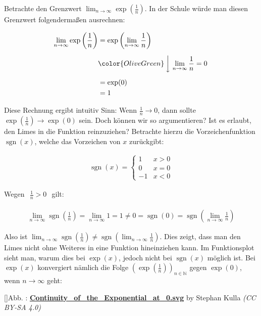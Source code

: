\documentclass[fontsize=9pt,
               parskip=half-,
               DIV=14,
               listof=chapterentry,
               tocflat]{scrbook}
\newcounter{imagelabel}
\begin{document}
Betrachte den Grenzwert $\lim _{n\to \infty }\exp \left({\tfrac {1}{n}}\right)$. In der Schule würde man diesen Grenzwert folgendermaßen ausrechnen:

\begin{align*}
\lim _{n\to \infty }\exp \left({\frac {1}{n}}\right)&=\exp \left(\lim _{n\to \infty }{\frac {1}{n}}\right)\\[0.5em]&{\color {OliveGreen}\left\downarrow \ \lim _{n\to \infty }{\frac {1}{n}}=0\right.}\\[0.5em]&=\exp(0)\\&=1
\end{align*}

Diese Rechnung ergibt intuitiv Sinn: Wenn ${\tfrac {1}{n}}\to 0$, dann sollte $\exp \left({\tfrac {1}{n}}\right)\to \exp(0)$ sein. Doch können wir so argumentieren? Ist es erlaubt, den Limes in die Funktion reinzuziehen? Betrachte hierzu die Vorzeichenfunktion $\operatorname {sgn}(x)$, welche das Vorzeichen von $x$ zurückgibt:

\begin{align*}
\operatorname {sgn}(x)={\begin{cases}1&x>0\\0&x=0\\-1&x<0\end{cases}}
\end{align*}

Wegen ${\begin{aligned}{\tfrac {1}{n}}>0\end{aligned}}$ gilt:

\begin{align*}
\lim _{n\to \infty }\operatorname {sgn} \left({\tfrac {1}{n}}\right)=\lim _{n\to \infty }1=1\neq 0=\operatorname {sgn}(0)=\operatorname {sgn} \left(\lim _{n\to \infty }{\frac {1}{n}}\right)
\end{align*}

Also ist $\lim _{n\to \infty }\operatorname {sgn} \left({\tfrac {1}{n}}\right)\neq \operatorname {sgn} \left(\lim _{n\to \infty }{\tfrac {1}{n}}\right)$. Dies zeigt, dass man den Limes nicht ohne Weiteres in eine Funktion hineinziehen kann. Im Funktionsplot sieht man, warum dies bei $\exp(x)$, jedoch nicht bei $\operatorname {sgn}(x)$ möglich ist. Bei $\exp(x)$ konvergiert nämlich die Folge $\left(\exp \left({\tfrac {1}{n}}\right)\right)_{n\in \mathbb {N} }$ gegen $\exp(0)$, wenn $n\to \infty $ geht:

[]{Abb. : \protect\href{https://commons.wikimedia.org/wiki/File:Continuity_of_the_Exponential_at_0.svg}{\textbf{Continuity\allowbreak\_of\allowbreak\_the\allowbreak\_Exponential\allowbreak\_at\allowbreak\_0.svg}} by Stephan Kulla \textit{(CC BY-SA 4.0)}}\begin{center}
\end{center}
\end{document}
